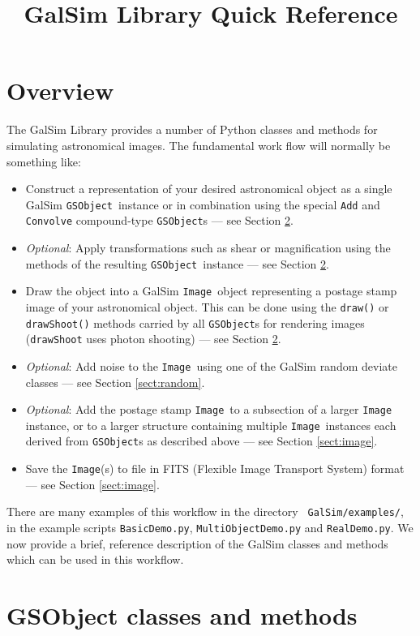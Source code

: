 \documentclass[preprint,10pt]{aastex}
\newcommand{\gsobject}{{\tt GSObject}}
\newcommand{\image}{{\tt Image}}
\begin{document}
\title{GalSim Library Quick Reference}

\section{Overview}
The GalSim Library provides a number of Python classes and methods for
simulating astronomical images.  The fundamental work flow will
normally be something like:
\begin{itemize}

\item Construct a representation of your desired astronomical object
  as a single GalSim \gsobject~instance or in combination using the special {\tt Add} and
  {\tt Convolve} compound-type \gsobject s --- see Section \ref{sect:gsobjects}.
\item \emph{Optional}: Apply transformations such as shear or magnification using
  the methods of the resulting \gsobject~instance --- see Section \ref{sect:gsobjects}.
\item Draw the object into a GalSim \image~object representing a
  postage stamp image of your astronomical object.  This can be done
  using the {\tt draw()} or {\tt drawShoot()} methods carried by all
  \gsobject s for rendering images ({\tt drawShoot} uses photon
  shooting) --- see Section \ref{sect:gsobjects}.
\item \emph{Optional}: Add noise to the \image~using one of the GalSim random
  deviate classes --- see Section \ref{sect:random}.
\item \emph{Optional}: Add the postage stamp \image~to a subsection of
  a larger \image~ instance, or to a larger
  structure containing multiple \image~instances each derived from \gsobject s
  as described above --- see Section \ref{sect:image}.
\item Save the \image (s) to file in FITS (Flexible Image Transport
  System) format --- see Section \ref{sect:image}.
\end{itemize}

There are many examples of this workflow in the directory {\tt
  GalSim/examples/}, in the example scripts {\tt BasicDemo.py},
{\tt MultiObjectDemo.py} and {\tt RealDemo.py}.  We now provide a
brief, reference description of the GalSim classes and methods which
can be used in this workflow.

\newpage 

\section{GSObject classes and methods}\label{sect:gsobjects}
\end{document}
